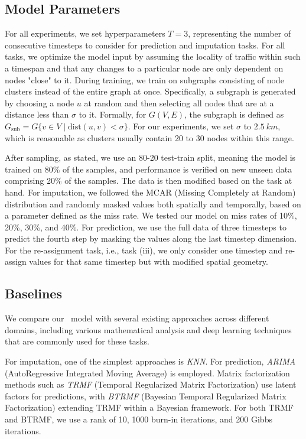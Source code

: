 \subsection{Model Parameters}

For all experiments, we set hyperparameters \(T = 3\), representing the number of consecutive timesteps to consider for prediction and imputation tasks. For all tasks, we optimize the model input by assuming the locality of traffic within such a timespan and that any changes to a particular node are only dependent on nodes "close" to it. During training, we train on subgraphs consisting of node clusters instead of the entire graph at once. Specifically, a subgraph is generated by choosing a node \(u\) at random and then selecting all nodes that are at a distance less than \(\sigma\) to it. Formally, for \(G(V, E)\), the subgraph is defined as \(G_{\text{sub}} = G\{v \in V \mid \text{dist}(u, v) < \sigma\}\). For our experiments, we set \(\sigma\) to \(2.5\ km\), which is reasonable as clusters usually contain 20 to 30 nodes within this range.

After sampling, as stated, we use an 80-20 test-train split, meaning the model is trained on 80\% of the samples, and performance is verified on new unseen data comprising 20\% of the samples. The data is then modified based on the task at hand. For imputation, we followed the MCAR (Missing Completely at Random) distribution and randomly masked values both spatially and temporally, based on a parameter defined as the miss rate. We tested our model on miss rates of 10\%, 20\%, 30\%, and 40\%. For prediction, we use the full data of three timesteps to predict the fourth step by masking the values along the last timestep dimension. For the re-assignment task, i.e., task (iii), we only consider one timestep and re-assign values for that same timestep but with modified spatial geometry.

\subsection{Baselines}

We compare our \name\ model with several existing approaches across different domains, including various mathematical analysis and deep learning techniques that are commonly used for these tasks.

For imputation, one of the simplest approaches is \textit{KNN}. For prediction, \textit{ARIMA} (AutoRegressive Integrated Moving Average) \cite{arima} is employed. Matrix factorization methods such as \textit{TRMF} (Temporal Regularized Matrix Factorization) \cite{trmf} use latent factors for predictions, with \textit{BTRMF} (Bayesian Temporal Regularized Matrix Factorization) extending TRMF within a Bayesian framework. For both TRMF and BTRMF, we use a rank of 10, 1000 burn-in iterations, and 200 Gibbs iterations.

